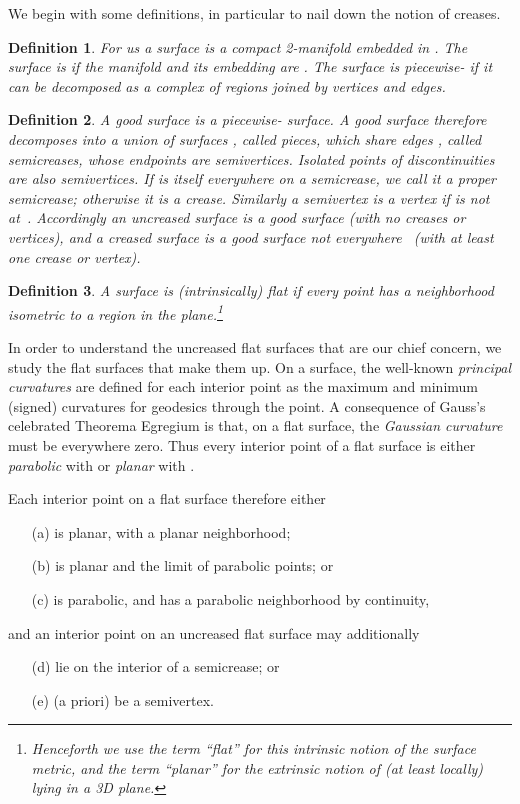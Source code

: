 \documentclass[11pt,letterpaper]{article}
\newtheorem{definition}{Definition}
\newcommand\term[1]{\emph{#1}}
\begin{document}
We begin with some definitions, in particular to nail down the notion
of creases.

\begin{definition}
  For us a \term{surface} is a compact 2-manifold embedded in .
  The surface is  if the manifold and its embedding are .
  The surface is \term{piecewise-} if it can be decomposed as a
  complex of  regions joined by vertices and  edges.
\end{definition}

\begin{definition}
  A \term{good surface} is a piecewise- surface.  A good surface
   therefore decomposes into a union of  surfaces ,
  called \term{pieces}, which share  edges , called
  \term{semicreases}, whose endpoints are \term{semivertices}.
  Isolated points of  discontinuities are also \term{semivertices}.
  If  is itself  everywhere on a semicrease,
  we call it a \term{proper semicrease}; otherwise it is a \term{crease}.
  Similarly a semivertex  is a \term{vertex} if  is not  at~.
  Accordingly an \term{uncreased surface} is a  good surface
  (with no creases or vertices),
  and a \term{creased surface} is a good surface not everywhere~
  (with at least one crease or vertex).
\end{definition}

\begin{definition}
  A surface is \term{(intrinsically) flat} if every point  has a
  neighborhood isometric to a region in the plane.\footnote{Henceforth we use the term ``flat'' for this intrinsic notion
    of the surface metric, and the term ``planar'' for the extrinsic notion
    of (at least locally) lying in a 3D plane.}
\end{definition}

In order to understand the uncreased flat surfaces that are our chief
concern, we study the  flat surfaces that make them up.
On a  surface, the well-known \term{principal curvatures}
 are defined for each interior point as the
maximum and minimum (signed) curvatures for geodesics through the
point.  A consequence of Gauss's celebrated Theorema Egregium
\cite{Gauss-1902} is that, on a  flat surface, the \term{Gaussian
  curvature}  must be everywhere zero.  Thus every
interior point of a  flat surface is either \term{parabolic} with
 or \term{planar} with .

Each interior point  on a  flat surface therefore either
\begin{enumerate}
\item[(a)] is planar, with a planar neighborhood;
\item[(b)] is planar and the limit of parabolic points; or
\item[(c)] is parabolic, and has a parabolic neighborhood by continuity,
\end{enumerate}
and an interior point on an uncreased flat surface may additionally
\begin{enumerate}
\item[(d)] lie on the interior of a semicrease; or
\item[(e)] (a priori) be a semivertex.
\end{enumerate}
\end{document}
